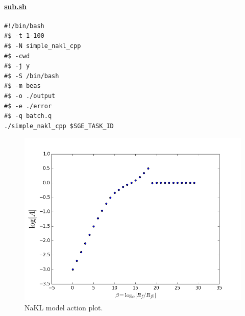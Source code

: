 \documentclass[11pt]{article}
\begin{document}
{\paragraph{\underline{sub.sh}}

\begin{verbatim}
#!/bin/bash
#$ -t 1-100
#$ -N simple_nakl_cpp
#$ -cwd
#$ -j y
#$ -S /bin/bash
#$ -m beas
#$ -o ./output
#$ -e ./error
#$ -q batch.q
./simple_nakl_cpp $SGE_TASK_ID
\end{verbatim}

\begin{figure}[h]
\centering
\includegraphics[width=1\textwidth]{figure/NaKL/action.png}
\caption{NaKL model action plot.}
\label{fig:NaKL}
\end{figure}

}
\end{document}

